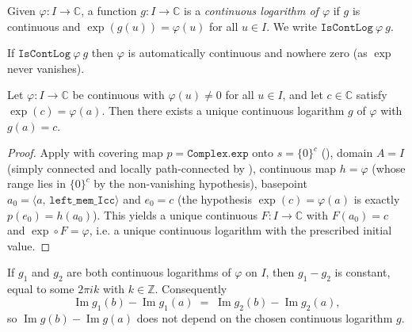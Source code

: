 \begin{definition}
\label{def:av_isContLog}
\leanok
{}
Given $\varphi:I\to\mathbb{C}$, a function $g:I\to\mathbb{C}$ is a
\emph{continuous logarithm of $\varphi$} if $g$ is continuous and
$\exp(g(u))=\varphi(u)$ for all $u\in I$. We write $\texttt{IsContLog}\ \varphi\ g$.
\end{definition}

If $\texttt{IsContLog}\ \varphi\ g$ then $\varphi$ is automatically continuous and
nowhere zero (as $\exp$ never vanishes).

\begin{lemma}
\label{lem:av_exists}
\leanok
{}
Let $\varphi:I\to\mathbb{C}$ be continuous with $\varphi(u)\neq0$ for all $u\in I$,
and let $c\in\mathbb{C}$ satisfy $\exp(c)=\varphi(a)$. Then there exists a unique
continuous logarithm $g$ of $\varphi$ with $g(a)=c$.
\end{lemma}

\begin{proof}
\leanok
{}
Apply  with covering map $p=\texttt{Complex.exp}$ onto
$s=\{0\}^c$ (), domain $A=I$ (simply connected and locally
path-connected by ), continuous map $h=\varphi$ (whose range
lies in $\{0\}^c$ by the non-vanishing hypothesis), basepoint $a_0=\langle a,\,
\mathtt{left\_mem\_Icc}\rangle$ and $e_0=c$ (the hypothesis $\exp(c)=\varphi(a)$ is
exactly $p(e_0)=h(a_0)$). This yields a unique continuous $F:I\to\mathbb{C}$ with
$F(a_0)=c$ and $\exp\circ F=\varphi$, i.e. a unique continuous logarithm with the
prescribed initial value.
\end{proof}

\begin{lemma}
\label{lem:av_unique}
\leanok
{}
If $g_1$ and $g_2$ are both continuous logarithms of $\varphi$ on $I$, then
$g_1-g_2$ is constant, equal to some $2\pi i k$ with $k\in\mathbb{Z}$. Consequently
\[
  \operatorname{Im} g_1(b) - \operatorname{Im} g_1(a)
  \;=\;
  \operatorname{Im} g_2(b) - \operatorname{Im} g_2(a),
\]
so $\operatorname{Im} g(b)-\operatorname{Im} g(a)$ does not depend on the chosen
continuous logarithm $g$.
\end{lemma}

